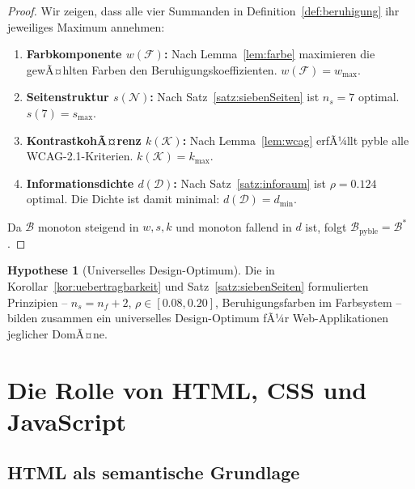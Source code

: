 ﻿\documentclass[a4paper,12pt]{article}
\theoremstyle{definition}
\newtheorem{hypothese}{Hypothese}
\begin{document}
\begin{proof}
    Wir zeigen, dass alle vier Summanden in Definition~\ref{def:beruhigung}
    ihr jeweiliges Maximum annehmen:

    \begin{enumerate}
        \item \textbf{Farbkomponente $w(\mathcal{F})$:}
              Nach Lemma~\ref{lem:farbe} maximieren die gewÃ¤hlten Farben
              den Beruhigungskoeffizienten. $w(\mathcal{F}) = w_{\max}$.

        \item \textbf{Seitenstruktur $s(\mathcal{N})$:}
              Nach Satz~\ref{satz:siebenSeiten} ist $n_s = 7$ optimal.
              $s(7) = s_{\max}$.

        \item \textbf{KontrastkohÃ¤renz $k(\mathcal{K})$:}
              Nach Lemma~\ref{lem:wcag} erfÃ¼llt pyble alle WCAG-2.1-Kriterien.
              $k(\mathcal{K}) = k_{\max}$.

        \item \textbf{Informationsdichte $d(\mathcal{D})$:}
              Nach Satz~\ref{satz:inforaum} ist $\rho = 0.124$ optimal.
              Die Dichte ist damit minimal: $d(\mathcal{D}) = d_{\min}$.
    \end{enumerate}

    Da $\mathcal{B}$ monoton steigend in $w, s, k$ und monoton fallend in $d$
    ist, folgt $\mathcal{B}_{\text{pyble}} = \mathcal{B}^*$.
\end{proof}

\begin{hypothese}[Universelles Design-Optimum]
\label{hyp:universell}
    Die in Korollar~\ref{kor:uebertragbarkeit} und Satz~\ref{satz:siebenSeiten}
    formulierten Prinzipien -- $n_s = n_f + 2$, $\rho \in [0.08, 0.20]$,
    Beruhigungsfarben im Farbsystem -- bilden zusammen ein universelles
    Design-Optimum fÃ¼r Web-Applikationen jeglicher DomÃ¤ne.
\end{hypothese}

\section{Die Rolle von HTML, CSS und JavaScript}

\subsection{HTML als semantische Grundlage}
\end{document}
